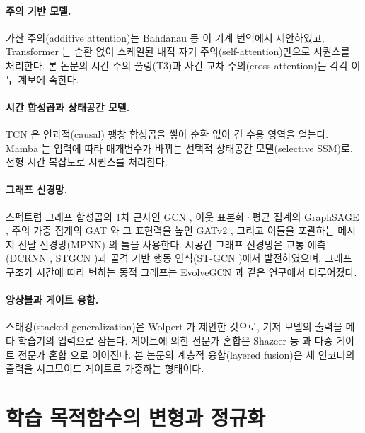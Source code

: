 \paragraph{주의 기반 모델.} 가산 주의(additive attention)는 Bahdanau 등 \cite{bahdanau2015neural}이 기계 번역에서 제안하였고, Transformer \cite{vaswani2017attention}는 순환 없이 스케일된 내적 자기 주의(self-attention)만으로 시퀀스를 처리한다. 본 논문의 시간 주의 풀링(T3)과 사건 교차 주의(cross-attention)는 각각 이 두 계보에 속한다.

\paragraph{시간 합성곱과 상태공간 모델.} TCN \cite{bai2018empirical}은 인과적(causal) 팽창 합성곱을 쌓아 순환 없이 긴 수용 영역을 얻는다. Mamba \cite{gu2023mamba}는 입력에 따라 매개변수가 바뀌는 선택적 상태공간 모델(selective SSM)로, 선형 시간 복잡도로 시퀀스를 처리한다.

\paragraph{그래프 신경망.} 스펙트럼 그래프 합성곱의 1차 근사인 GCN \cite{kipf2017semi}, 이웃 표본화·평균 집계의 GraphSAGE \cite{hamilton2017inductive}, 주의 가중 집계의 GAT \cite{velickovic2018graph}와 그 표현력을 높인 GATv2 \cite{brody2022how}, 그리고 이들을 포괄하는 메시지 전달 신경망(MPNN) \cite{gilmer2017neural}의 틀을 사용한다. 시공간 그래프 신경망은 교통 예측(DCRNN \cite{li2018diffusion}, STGCN \cite{yu2018spatio})과 골격 기반 행동 인식(ST-GCN \cite{yan2018spatial})에서 발전하였으며, 그래프 구조가 시간에 따라 변하는 동적 그래프는 EvolveGCN \cite{pareja2020evolvegcn}과 같은 연구에서 다루어졌다.

\paragraph{앙상블과 게이트 융합.} 스태킹(stacked generalization)은 Wolpert \cite{wolpert1992stacked}가 제안한 것으로, 기저 모델의 출력을 메타 학습기의 입력으로 삼는다. 게이트에 의한 전문가 혼합은 Shazeer 등 \cite{shazeer2017outrageously}과 다중 게이트 전문가 혼합 \cite{ma2018modeling}으로 이어진다. 본 논문의 계층적 융합(layered fusion)은 세 인코더의 출력을 시그모이드 게이트로 가중하는 형태이다.

\section{학습 목적함수의 변형과 정규화}
\label{sec:bg-objectives}

